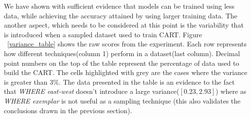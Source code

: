 \documentclass{sig-alternative}
\begin{document}
We have shown with sufficient evidence that models can be trained using less data, while achieving the accuracy
attained by using larger training data. 
The another aspect, which needs to be considered at this point is the variability that is introduced  when a sampled dataset used to train CART. 
Figure ~\ref{variance_table} shows the raw scores from the experiment. Each row represents how different techniques(column 1) perform in a dataset(last column). Decimal point numbers on the top of the table represent the percentage of data used to build the CART. The cells highlighted with grey are the cases where the variance is greater than 3\%. The data presented in the table is an evidence to the fact  that \textit{WHERE east-west} doesn't introduce a large variance($[0.23, 2.93]$) where as \textit{WHERE exemplar} is not useful as a sampling technique (this also validates the conclusions drawn in the previous section). 
\end{document}
